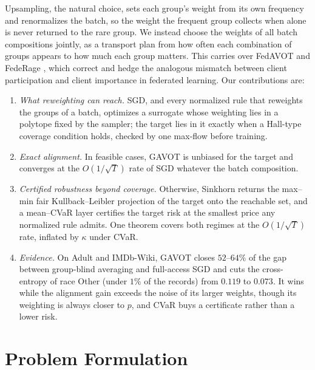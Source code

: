 \documentclass{article}
\theoremstyle{definition}
\newcommand{\avot}{\textsf{GAVOT}}
\begin{document}
Upsampling, the natural choice, sets each group's weight from its own
frequency and renormalizes the batch, so the weight the frequent group
collects when alone is never returned to the rare group. We instead
choose the weights of all batch compositions jointly, as a transport plan
from how often each combination of groups appears to how much each group
matters. This carries over \textsf{FedAVOT} \cite{rahimi2025fedavot} and
\textsf{FedeRage} \cite{rahimi2026federage}, which correct and hedge the
analogous mismatch between client participation and client importance in
federated learning. Our contributions are:
\begin{enumerate}\itemsep0pt\parskip0pt
\item \emph{What reweighting can reach.} SGD, and every normalized rule
that reweights the groups of a batch, optimizes a surrogate whose
weighting lies in a polytope fixed by the sampler; the target lies in it
exactly when a Hall-type coverage condition holds, checked by one
max-flow before training.
\item \emph{Exact alignment.} In feasible cases, \avot{} is unbiased for the
target and converges at the $O(1/\sqrt T)$ rate of SGD whatever the batch composition.
\item \emph{Certified robustness beyond coverage.} Otherwise, Sinkhorn
returns the max--min fair Kullback--Leibler projection of the target onto
the reachable set, and a mean--CVaR layer certifies the target risk at the
smallest price any normalized rule admits. One theorem covers both regimes
at the $O(1/\sqrt T)$ rate, inflated by $\kappa$ under CVaR.
\item \emph{Evidence.} On Adult and IMDb-Wiki, \avot{} closes
$52$--$64\%$ of the gap between group-blind averaging and full-access SGD
and cuts the cross-entropy of race Other (under $1\%$ of the records) from
$0.119$ to $0.073$. It wins while the alignment gain exceeds the noise of
its larger weights, though its weighting is always closer to $p$, and
CVaR buys a certificate rather than a lower risk.
\end{enumerate}

\vspace{-6pt}
\vspace{-6pt}\section{Problem Formulation}
\vspace{-8pt}
\label{sec:setup}
\end{document}
